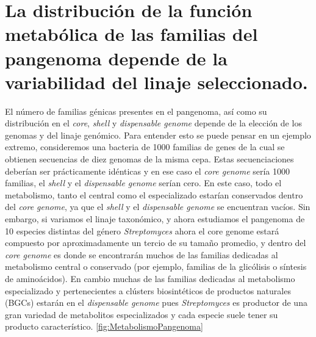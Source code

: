 \documentclass[12pt,twoside]{reedthesis}
\begin{document}
  \section{La distribución de la función metabólica de las familias del
  pangenoma depende de la variabilidad del linaje
  seleccionado.}\label{la-distribucion-de-la-funcion-metabolica-de-las-familias-del-pangenoma-depende-de-la-variabilidad-del-linaje-seleccionado.}
  
  El número de familias génicas presentes en el pangenoma, así como su
  distribución en el \emph{core}, \emph{shell} y \emph{dispensable genome}
  depende de la elección de los genomas y del linaje genómico. Para
  entender esto se puede pensar en un ejemplo extremo, consideremos una
  bacteria de 1000 familias de genes de la cual se obtienen secuencias de
  diez genomas de la misma cepa. Estas secuenciaciones deberían ser
  prácticamente idénticas y en ese caso el \emph{core genome} sería 1000
  familias, el \emph{shell} y el \emph{dispensable genome} serían cero. En
  este caso, todo el metabolismo, tanto el central como el especializado
  estarían conservados dentro del \emph{core genome}, ya que el
  \emph{shell} y el \emph{dispensable genome} se encuentran vacíos. Sin
  embargo, si variamos el linaje taxonómico, y ahora estudiamos el
  pangenoma de 10 especies distintas del género \emph{Streptomyces} ahora
  el core genome estará compuesto por aproximadamente un tercio de su
  tamaño promedio, y dentro del \emph{core genome} es donde se encontrarán
  muchos de las familias dedicadas al metabolismo central o conservado
  (por ejemplo, familias de la glicólisis o síntesis de aminoácidos). En
  cambio muchas de las familias dedicadas al metabolismo especializado y
  pertenecientes a clústers biosintéticos de productos naturales (BGCs)
  estarán en el \emph{dispensable genome} pues \emph{Streptomyces} es
  productor de una gran variedad de metabolitos especializados y cada
  especie suele tener su producto característico.
  \autoref{fig:MetabolismoPangenoma}
  
\end{document}
